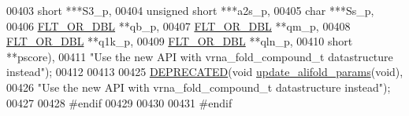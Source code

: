 \begin{DoxyCode}
00403                      \textcolor{keywordtype}{short} ***S3\_p,
00404                      \textcolor{keywordtype}{unsigned} \textcolor{keywordtype}{short} ***a2s\_p,
00405                      \textcolor{keywordtype}{char} ***Ss\_p,
00406                      \mbox{\hyperlink{group__data__structures_ga31125aeace516926bf7f251f759b6126}{FLT\_OR\_DBL}} **qb\_p,
00407                      \mbox{\hyperlink{group__data__structures_ga31125aeace516926bf7f251f759b6126}{FLT\_OR\_DBL}} **qm\_p,
00408                      \mbox{\hyperlink{group__data__structures_ga31125aeace516926bf7f251f759b6126}{FLT\_OR\_DBL}} **q1k\_p,
00409                      \mbox{\hyperlink{group__data__structures_ga31125aeace516926bf7f251f759b6126}{FLT\_OR\_DBL}} **qln\_p,
00410                      \textcolor{keywordtype}{short} **pscore),
00411           \textcolor{stringliteral}{"Use the new API with vrna\_fold\_compound\_t datastructure instead"});
00412 
00413 
00425 \mbox{\hyperlink{alifold_8h_aab347a3c03fbe8e7319551b9fa0cce4a}{DEPRECATED}}(\textcolor{keywordtype}{void} \mbox{\hyperlink{group__consensus__fold_gac484c6bd429bafbd353b91044508d8e9}{update\_alifold\_params}}(\textcolor{keywordtype}{void}),
00426           \textcolor{stringliteral}{"Use the new API with vrna\_fold\_compound\_t datastructure instead"});
00427 
00428 \textcolor{preprocessor}{#endif}
00429 
00430 
00431 \textcolor{preprocessor}{#endif}
\end{DoxyCode}
